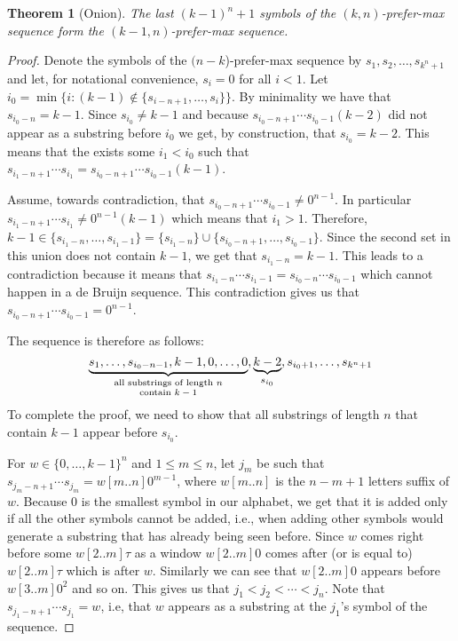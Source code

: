 \documentclass{article}
\newtheorem{theorem}{Theorem}
\theoremstyle{definition}
\begin{document}
\begin{theorem}[Onion]
	The last $(k-1)^n+1$ symbols of the $(k,n)$-prefer-max sequence form the $(k-1,n)$-prefer-max sequence.
\label{thm:onion}
\end{theorem}
\begin{proof}
	Denote the symbols of the $(n-k$)-prefer-max sequence by $s_1,s_2,\dots,s_{k^n+1}$ and let, for notational convenience, $s_i=0$ for all $i<1$. Let ${i_0} = \min\bigl\{i\colon (k-1) \notin \{s_{i-n+1},\dots,s_{i}\}\bigr\}$. 
	By minimality we have that $s_{{i_0}-n}=k-1$. Since $s_{i_0} \neq k-1$ and because $s_{{i_0}-n+1}\cdots s_{{i_0}-1} (k-2)$ did not appear as a substring before ${i_0}$ we get, by construction, that $s_{{i_0}}=k-2$. This means that the exists some ${i_1}<{i_0}$ such that $s_{{i_1}-n+1}\cdots s_{{i_1}} = s_{{i_0}-n+1}\cdots s_{{i_0}-1}(k-1)$.
	
	Assume, towards contradiction, that $s_{{i_0}-n+1}\cdots s_{{i_0}-1} \neq 0^{n-1}$. In particular $s_{{i_1}-n+1}\cdots s_{{i_1}} \neq 0^{n-1}(k-1)$ which means that ${i_1} > 1$. Therefore, $k-1  \in \{s_{{i_1}-n},\dots,s_{{i_1}-1}\}=\{s_{{i_1}-n}\} \cup \{s_{{i_0}-n+1},\dots,s_{{i_0}-1}\}$. Since the second set in this union does not contain $k-1$, we get that $s_{{i_1}-n}=k-1$. This leads to a contradiction because it means that $s_{{i_1}-n}\cdots s_{{i_1}-1} = s_{{i_0}-n}\cdots s_{{i_0}-1}$ which cannot happen in a de Bruijn sequence. This contradiction gives us that $s_{{i_0}-n+1}\cdots s_{{i_0}-1} = 0^{n-1}$.
	
	The sequence is therefore as follows:
	$$\underbrace{s_1,\dots,s_{i_0-n-1},k-1,{0,\dots,0}}_{\parbox{10 em}{\scriptsize \centering{all substrings of length $n$ contain $k-1$}}},\underbrace{k-2}_{s_{i_0}},s_{i_0+1},\dots,s_{k^n+1}$$
	To complete the proof, we need to show that all substrings of length $n$ that contain $k-1$ appear before $s_{i_0}$.
	
	For $w \in \{0,\dots,k-1\}^n$ and $1 \leq m \leq n$, let $j_m$ be such that $s_{j_m-n+1}\cdots s_{j_m} = w[m..n]0^{m-1}$, where $w[m..n]$ is the $n-m+1$ letters suffix of $w$. 
	Because $0$ is the smallest symbol in our alphabet, we get that it is added only if all the other symbols cannot be added, i.e., when adding other symbols would generate a substring that has already being seen before. 
	Since $w$ comes right before some $w[2..m]\tau$ as a window $w[2..m]0$ comes after (or is equal to) $w[2..m]\tau$ which is after $w$. Similarly we can see that $w[2..m]0$ appears before $w[3..m]0^2$ and so on.
	This gives us that $j_1 < j_2 < \cdots < j_n$. Note that $s_{j_1-n+1}\cdots s_{j_1}=w$, i.e, that $w$ appears as a substring at the $j_1$'s symbol of the sequence.
	 

\end{proof}
\end{document}
